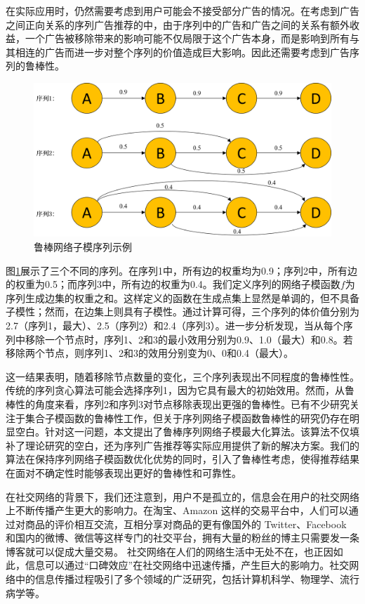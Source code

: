 在实际应用时，仍然需要考虑到用户可能会不接受部分广告的情况。在考虑到广告之间正向关系的序列广告推荐的中，由于序列中的广告和广告之间的关系有额外收益，一个广告被移除带来的影响可能不仅局限于这个广告本身，而是影响到所有与其相连的广告而进一步对整个序列的价值造成巨大影响。因此还需要考虑到广告序列的鲁棒性。

\begin{figure}[th]
    \centering
    \includegraphics[width=.89\linewidth]{figure/rosenets/sample1}
    \caption{鲁棒网络子模序列示例}
    \label{fig:robust_sample}
\end{figure}

图\ref{fig:robust_sample}展示了三个不同的序列。在序列1中，所有边的权重均为0.9；序列2中，所有边的权重为0.5；而序列3中，所有边的权重为0.4。我们定义序列的网络子模函数$f$为序列生成边集的权重之和。这样定义的函数在生成点集上显然是单调的，但不具备子模性；然而，在边集上则具有子模性。通过计算可得，三个序列的体价值分别为2.7（序列1，最大）、2.5（序列2）和2.4（序列3）。进一步分析发现，当从每个序列中移除一个节点时，序列1、2和3的最小效用分别为0.9、1.0（最大）和0.8。若移除两个节点，则序列1、2和3的效用分别变为0、0和0.4（最大）。

这一结果表明，随着移除节点数量的变化，三个序列表现出不同程度的鲁棒性性。传统的序列贪心算法\cite{tschiatschek2017selecting,mitrovic2018submodularity}可能会选择序列1，因为它具有最大的初始效用。然而，从鲁棒性的角度来看，序列2和序列3对节点移除表现出更强的鲁棒性。已有不少研究关注于集合子模函数的鲁棒性工作\cite{orlin2018robust,bogunovic2017robust,mitrovic2017streaming,tzoumas2017resilient}，但关于序列网络子模函数鲁棒性的研究仍存在明显空白。针对这一问题，本文提出了鲁棒序列网络子模最大化算法。该算法不仅填补了理论研究的空白，还为序列广告推荐等实际应用提供了新的解决方案。我们的算法在保持序列网络子模函数优化优势的同时，引入了鲁棒性考虑，使得推荐结果在面对不确定性时能够表现出更好的鲁棒性和可靠性。

在社交网络的背景下，我们还注意到，用户不是孤立的，信息会在用户的社交网络上不断传播产生更大的影响力。在淘宝、Amazon 这样的交易平台中，人们可以通过对商品的评价相互交流，互相分享对商品的更有像国外的 Twitter、Facebook 和国内的微博、微信等这样专门的社交平台，拥有大量的粉丝的博主只需要发一条博客就可以促成大量交易。
社交网络在人们的网络生活中无处不在，也正因如此，信息可以通过“口碑效应”在社交网络中迅速传播，产生巨大的影响力。社交网络中的信息传播过程吸引了多个领域的广泛研究，包括计算机科学、物理学、流行病学等\cite{li2018influence}。

